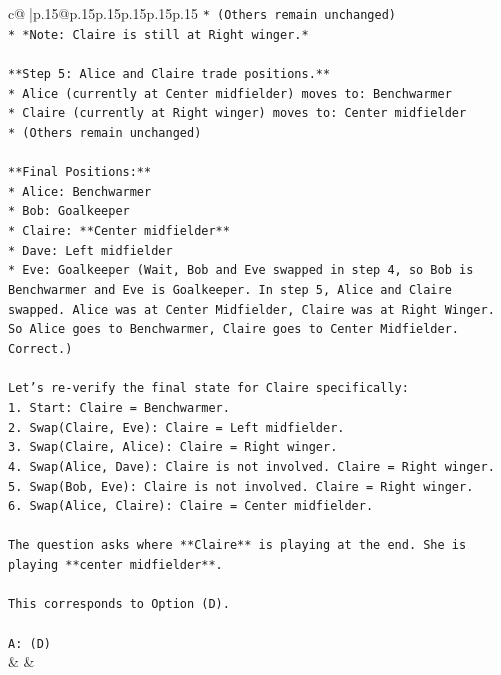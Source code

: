 \documentclass{article}
\begin{document}
{\begin{supertabular}{c@{$\;$}|p{.15\linewidth}@{}p{.15\linewidth}p{.15\linewidth}p{.15\linewidth}p{.15\linewidth}p{.15\linewidth}}
{{{\texttt{*   (Others remain unchanged)} \\
\texttt{*   *Note: Claire is still at Right winger.*} \\
\\ 
\texttt{**Step 5: Alice and Claire trade positions.**} \\
\texttt{*   Alice (currently at Center midfielder) moves to: Benchwarmer} \\
\texttt{*   Claire (currently at Right winger) moves to: Center midfielder} \\
\texttt{*   (Others remain unchanged)} \\
\\ 
\texttt{**Final Positions:**} \\
\texttt{*   Alice: Benchwarmer} \\
\texttt{*   Bob: Goalkeeper} \\
\texttt{*   Claire: **Center midfielder**} \\
\texttt{*   Dave: Left midfielder} \\
\texttt{*   Eve: Goalkeeper (Wait, Bob and Eve swapped in step 4, so Bob is Benchwarmer and Eve is Goalkeeper. In step 5, Alice and Claire swapped. Alice was at Center Midfielder, Claire was at Right Winger. So Alice goes to Benchwarmer, Claire goes to Center Midfielder. Correct.)} \\
\\ 
\texttt{Let's re{-}verify the final state for Claire specifically:} \\
\texttt{1.  Start: Claire = Benchwarmer.} \\
\texttt{2.  Swap(Claire, Eve): Claire = Left midfielder.} \\
\texttt{3.  Swap(Claire, Alice): Claire = Right winger.} \\
\texttt{4.  Swap(Alice, Dave): Claire is not involved. Claire = Right winger.} \\
\texttt{5.  Swap(Bob, Eve): Claire is not involved. Claire = Right winger.} \\
\texttt{6.  Swap(Alice, Claire): Claire = Center midfielder.} \\
\\ 
\texttt{The question asks where **Claire** is playing at the end. She is playing **center midfielder**.} \\
\\ 
\texttt{This corresponds to Option (D).} \\
\\ 
\texttt{A: (D)} \\
            }
        }
    }
    & & \\ \\


\end{supertabular}}
\end{document}
